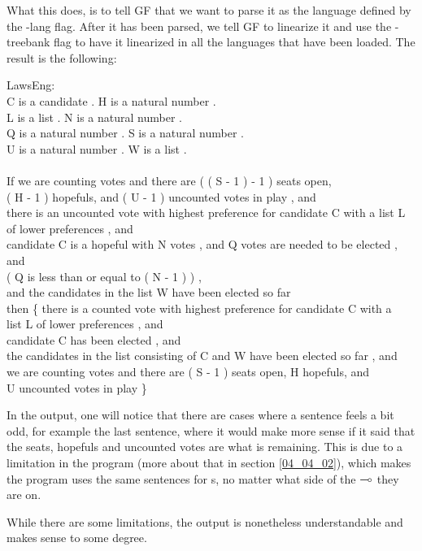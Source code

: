 What this does, is to tell GF that we want to parse it as the language defined by the -lang flag. After it has been parsed, we tell GF to linearize it  and use the -treebank flag to have it linearized in all the languages that have been loaded. The result is the following:

\begin{texto2}
LawsEng: \\
C is a candidate . H is a natural number . \\
L is a list . N is a natural number . \\
Q is a natural number . S is a natural number . \\
U is a natural number . W is a list .\\\\
If we are counting votes and there are ( ( S - 1 ) - 1 ) seats open, \\
( H - 1 ) hopefuls, and ( U - 1 ) uncounted votes in play , and \\
there is an uncounted vote with highest preference for candidate C with a list L \\
of lower preferences , and \\
candidate C is a hopeful with N votes , and Q votes are needed to be elected , and \\
( Q is less than or equal to ( N - 1 ) ) , \\
and the candidates in the list W have been elected so far \\
then \{ there is a counted vote with highest preference for candidate C with a \\
list L of lower preferences , and \\
candidate C has been elected , and \\
the candidates in the list consisting of C and W have been elected so far , and \\
we are counting votes and there are ( S - 1 ) seats open, H hopefuls, and \\
U uncounted votes in play \}
\end{texto2}

In the output, one will notice that there are cases where a sentence feels a bit odd, for example the last sentence, where it would make more sense if it said that the seats, hopefuls and uncounted votes are what is remaining. This is due to a limitation in the program (more about that in section \ref{04_04_02}), which makes the program uses the same sentences for s, no matter what side of the $\multimap$ they are on.

While there are some limitations, the output is nonetheless understandable and makes sense to some degree.